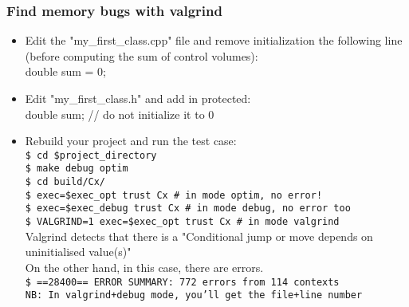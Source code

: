 \documentclass[10pt, hyperref={unicode=true,pdfusetitle, bookmarks=true,bookmarksnumbered=false,bookmarksopen=false, breaklinks=false,pdfborder={0 0 1},backref=true,colorlinks=true,linkcolor=darkblue,pageanchor, urlcolor=darkblue}]{beamer}
\begin{document}
\begin{frame}
\frametitle{Find memory bugs with valgrind}
\begin{block}{}

\begin{itemize}
\item Edit the "my\_first\_class.cpp" file and remove initialization the following line (before computing the sum of control volumes):\\
double sum = 0;
\item Edit "my\_first\_class.h" and add in protected:\\
double sum; // do not initialize it to 0
\item Rebuild your project and run the test case:\\
\texttt{\$ cd \$project\_directory}\\
\texttt{\$ make debug optim}\\
\texttt{\$ cd build/Cx/}\\
\texttt{\$ exec=\$exec\_opt trust Cx   \# in mode optim, no error!}\\
\texttt{\$ exec=\$exec\_debug trust Cx \# in mode debug, no error too}\\
\texttt{\$ VALGRIND=1 exec=\$exec\_opt trust Cx \# in mode valgrind} \\
Valgrind detects that there is a "Conditional jump or move depends on uninitialised value(s)"\\
On the other hand, in this case, there are errors.\\
\texttt{\$ ==28400== ERROR SUMMARY: 772 errors from 114 contexts} \\
\texttt{NB: In valgrind+debug mode, you'll get the file+line number }
\end{itemize}

\end{block}
\end{frame}
\end{document}

